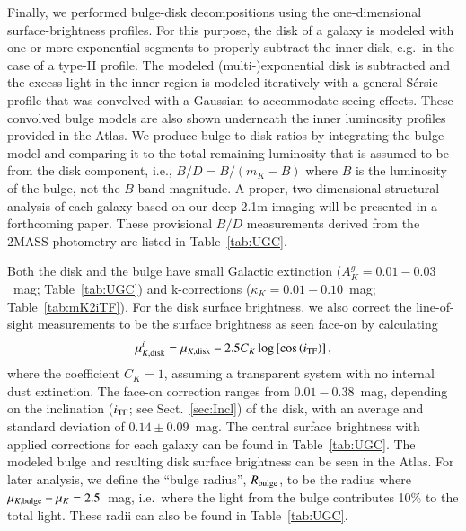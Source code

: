 \documentclass[traditabstract]{aa} %
\begin{document}
Finally, we performed bulge-disk decompositions using the one-dimensional
surface-brightness profiles.  For this purpose, the disk of a galaxy is modeled
with one or more exponential segments to properly subtract the inner disk, e.g.\
in the case of a type-II profile.  The modeled (multi-)exponential disk is
subtracted and the excess light in the inner region is modeled iteratively with
a general S{\'e}rsic profile that was convolved with a Gaussian to accommodate
seeing effects.  These convolved bulge models are also shown underneath the
inner luminosity profiles provided in the Atlas.  We produce bulge-to-disk
ratios by integrating the bulge model and comparing it to the total remaining
luminosity that is assumed to be from the disk component, i.e., $B/D = B/(m_K-B)$
where $B$ is the luminosity of the bulge, not the $B$-band magnitude.  A
proper, two-dimensional structural analysis of each galaxy based on our deep
2.1m imaging will be presented in a forthcoming paper.  These provisional $B/D$
measurements derived from the 2MASS photometry are listed in
Table~\ref{tab:UGC}.

Both the disk and the bulge have small Galactic extinction ($A_{K}^{g}=0.01-0.03$~mag;
Table~\ref{tab:UGC}) and k-corrections ($\kappa_{K}=0.01-0.10$~mag;
Table~\ref{tab:mK2iTF}). For the disk surface brightness, we also correct the
line-of-sight measurements to be the surface brightness as seen face-on by calculating
%
\begin{equation}
%
\mu_{K,\rm disk}^{i} = \mu_{K,\rm disk} - 2.5 C_{K}
\log\left[\cos\left(\itf\right)\right],
%
\label{eq:deproj_mu}
%
\end{equation}
%
where the coefficient $C_{K}=1$, assuming a transparent system with no internal
dust extinction. The face-on correction ranges from $0.01-0.38$~mag, depending
on the inclination ($i_{\rm TF}$; see Sect.~\ref{sec:Incl}) of the disk, with an
average and standard deviation of $0.14\pm0.09$~mag. The central surface brightness
with applied corrections for each galaxy can be found in Table~\ref{tab:UGC}.
The modeled bulge and resulting disk surface brightness can be seen in the Atlas.
For later analysis, we define the ``bulge radius'', $R_{\rm bulge}$, to be the radius where
$\mu_{K,\rm bulge}-\mu_{K}=2.5$~mag, i.e.\ where the light from the bulge
contributes 10\% to the total light. These radii can also be found in Table~\ref{tab:UGC}.


\end{document}
